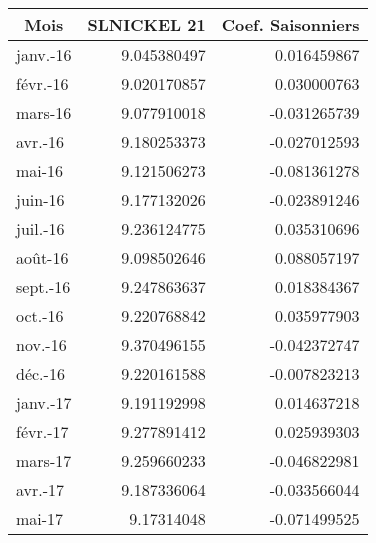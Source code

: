 \begin{tabular}{@{}lrr@{}}
    \toprule
    \multicolumn{1}{c}{Mois} & \multicolumn{1}{c}{SLNICKEL 21} & \multicolumn{1}{c}{Coef. Saisonniers} \\ \midrule
    janv.-16                 & 9.045380497                       & 0.016459867                       \\
    févr.-16                 & 9.020170857                       & 0.030000763                       \\
    mars-16                  & 9.077910018                       & -0.031265739                      \\
    avr.-16                  & 9.180253373                       & -0.027012593                      \\
    mai-16                   & 9.121506273                       & -0.081361278                      \\
    juin-16                  & 9.177132026                       & -0.023891246                      \\
    juil.-16                 & 9.236124775                       & 0.035310696                       \\
    août-16                  & 9.098502646                       & 0.088057197                       \\
    sept.-16                 & 9.247863637                       & 0.018384367                       \\
    oct.-16                  & 9.220768842                       & 0.035977903                       \\
    nov.-16                  & 9.370496155                       & -0.042372747                      \\
    déc.-16                  & 9.220161588                       & -0.007823213                      \\
    janv.-17                 & 9.191192998                       & 0.014637218                       \\
    févr.-17                 & 9.277891412                       & 0.025939303                       \\
    mars-17                  & 9.259660233                       & -0.046822981                      \\
    avr.-17                  & 9.187336064                       & -0.033566044                      \\
    mai-17                   & 9.17314048                        & -0.071499525                      \\

\end{tabular}
